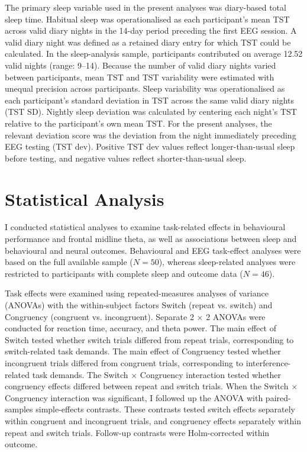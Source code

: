 \documentclass[12pt,a4paper]{report}
\begin{document}
The primary sleep variable used in the present analyses was diary-based total sleep time. Habitual sleep was operationalised as each participant's mean TST across valid diary nights in the 14-day period preceding the first EEG session. A valid diary night was defined as a retained diary entry for which TST could be calculated. In the sleep-analysis sample, participants contributed on average 12.52 valid nights (range: 9--14). Because the number of valid diary nights varied between participants, mean TST and TST variability were estimated with unequal precision across participants. Sleep variability was operationalised as each participant's standard deviation in TST across the same valid diary nights (TST SD). Nightly sleep deviation was calculated by centering each night's TST relative to the participant's own mean TST. For the present analyses, the relevant deviation score was the deviation from the night immediately preceding EEG testing (TST dev). Positive TST dev values reflect longer-than-usual sleep before testing, and negative values reflect shorter-than-usual sleep. 

\section{Statistical Analysis} 

I conducted statistical analyses to examine task-related effects in behavioural performance and frontal midline theta, as well as associations between sleep and behavioural and neural outcomes. Behavioural and EEG task-effect analyses were based on the full available sample (\(N = 50\)), whereas sleep-related analyses were restricted to participants with complete sleep and outcome data (\(N = 46\)).

Task effects were examined using repeated-measures analyses of variance (ANOVAs) with the within-subject factors Switch (repeat vs. switch) and Congruency (congruent vs. incongruent). Separate 2 \(\times\) 2 ANOVAs were conducted for reaction time, accuracy, and theta power. The main effect of Switch tested whether switch trials differed from repeat trials, corresponding to switch-related task demands. The main effect of Congruency tested whether incongruent trials differed from congruent trials, corresponding to interference-related task demands. The Switch \(\times\) Congruency interaction tested whether congruency effects differed between repeat and switch trials. When the Switch \(\times\) Congruency interaction was significant, I followed up the ANOVA with paired-samples simple-effects contrasts. These contrasts tested switch effects separately within congruent and incongruent trials, and congruency effects separately within repeat and switch trials. Follow-up contrasts were Holm-corrected within outcome.
\end{document}
